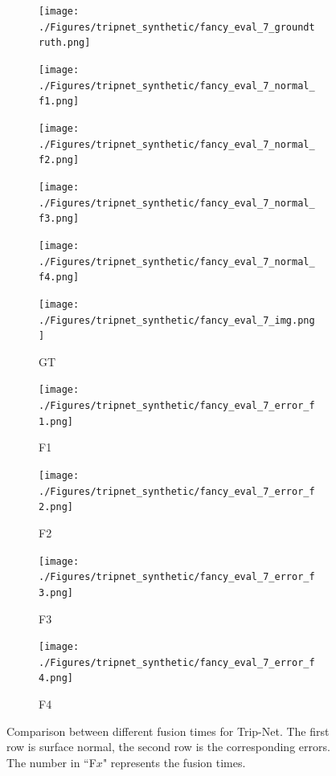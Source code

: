 \documentclass[border=15pt, multi, tikz]{article}
\begin{document}

\begin{figure}[H]
	\centering
	\begin{subfigure}[b]{0.18\linewidth}
		\texttt{[image: ./Figures/tripnet\_synthetic/fancy\_eval\_7\_groundtruth.png]}
	\end{subfigure}
	\begin{subfigure}[b]{0.18\linewidth}
		\texttt{[image: ./Figures/tripnet\_synthetic/fancy\_eval\_7\_normal\_f1.png]}
	\end{subfigure}
	\begin{subfigure}[b]{0.18\linewidth}
		\texttt{[image: ./Figures/tripnet\_synthetic/fancy\_eval\_7\_normal\_f2.png]}
	\end{subfigure}
	\begin{subfigure}[b]{0.18\linewidth}
		\texttt{[image: ./Figures/tripnet\_synthetic/fancy\_eval\_7\_normal\_f3.png]}
	\end{subfigure}
	\begin{subfigure}[b]{0.18\linewidth}
		\texttt{[image: ./Figures/tripnet\_synthetic/fancy\_eval\_7\_normal\_f4.png]}
	\end{subfigure}
	
	
		\begin{subfigure}[b]{0.18\linewidth}
		\texttt{[image: ./Figures/tripnet\_synthetic/fancy\_eval\_7\_img.png]}
		\caption{GT}
	\end{subfigure}
	\begin{subfigure}[b]{0.18\linewidth}
		\texttt{[image: ./Figures/tripnet\_synthetic/fancy\_eval\_7\_error\_f1.png]}
		\caption{F1}
	\end{subfigure}
	\begin{subfigure}[b]{0.18\linewidth}
		\texttt{[image: ./Figures/tripnet\_synthetic/fancy\_eval\_7\_error\_f2.png]}
		\caption{F2}
	\end{subfigure}
	\begin{subfigure}[b]{0.18\linewidth}
		\texttt{[image: ./Figures/tripnet\_synthetic/fancy\_eval\_7\_error\_f3.png]}
		\caption{F3}
	\end{subfigure}
	\begin{subfigure}[b]{0.18\linewidth}
		\texttt{[image: ./Figures/tripnet\_synthetic/fancy\_eval\_7\_error\_f4.png]}
		\caption{F4}
	\end{subfigure}
	
	
	\caption{Comparison between different fusion times for Trip-Net. The first row is surface normal, the second row is the corresponding errors. The number in ``F$ x $" represents the fusion times. }
	\label{fig:tripnet-eval-synthetic-zoom-in}
\end{figure}
\end{document}
